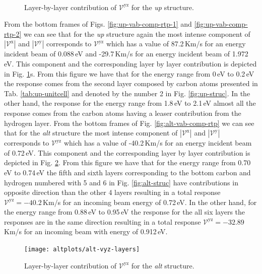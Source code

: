 \documentclass[prb,11pt,tightenlines,twocolumn,aps]{revtex4-1}
\begin{document}
\begin{figure}[t]
    \centering
    \\
    
    \caption{Layer-by-layer contribution of $\mathcal{V}^{\mathrm{yz}}$ for the
     \emph{up} structure.}
    \label{fig:up-vyz-lay}
\end{figure}

From the bottom frames of Figs. \ref{fig:up-vab-comp-rtp-1} and 
% 
\ref{fig:up-vab-comp-rtp-2} we can see that for the \emph{up} structure again
the most intense component of $|\mathcal{V}^{\mathrm{x}}|$ and
$|\mathcal{V}^{\mathrm{y}}|$ corresponds to $\mathcal{V}^{\mathrm{yz}}$ which
has a value of 87.2\,Km/s for an energy incident beam of 0.088\,eV and
-29.7\,Km/s for an energy incident beam of 1.972\,eV. This component and the
corresponding layer by layer contribution is depicted in Fig. 
\ref{fig:up-vyz-lay}s.
% 
From this figure we have that for the energy range from 0\,eV to 0.2\,eV the
response comes from the second layer composed by carbon atoms presented in Tab.
\ref{tab:up-unitcell} and denoted by the number 2 in Fig. \ref{fig:up-struc}. In
the other hand, the response for the energy range from 1.8\,eV to 2.1\,eV almost
all the response comes from the carbon atoms having a leaser contribution from
the hydrogen layer.
From the bottom frames of Fig. \ref{fig:alt-vab-comp-rtp} we can see that for
the \emph{alt} structure the most intense component of
$|\mathcal{V}^{\mathrm{x}}|$ and $|\mathcal{V}^{\mathrm{y}}|$ corresponds to
$\mathcal{V}^{\mathrm{yz}}$ which has a value of -40.2\,Km/s for an
energy incident beam of 0.72\,eV. This component and the corresponding layer by
layer contribution is depicted in Fig. \ref{fig:alt-vyz-lay}. From this figure
we have that for the energy range from 0.70\,eV to 0.74\,eV the fifth and sixth
layers corresponding to the bottom carbon and hydrogen numbered with 5 and 6 in
Fig. \ref{fig:alt-struc} have contributions in opposite direction than the other
4 layers resulting in a total response $\mathcal{V}^{\mathrm{yz}}= -40.2$\,Km/s
for an incoming beam energy of 0.72\,eV. In the other hand, for the energy range
from 0.88\,eV to 0.95\,eV the response for the all six layers the responses are
in the same direction resulting in a total response
$\mathcal{V}^{\mathrm{yz}}=-32.89$\,Km/s for an incoming beam with energy of
0.912\,eV.
\begin{figure}[b]
    \centering
    \texttt{[image: altplots/alt-vyz-layers]}
    
    \caption{Layer-by-layer contribution of $\mathcal{V}^{\mathrm{yz}}$ for the
     \emph{alt} structure.}
    \label{fig:alt-vyz-lay}
\end{figure}



\end{document}

